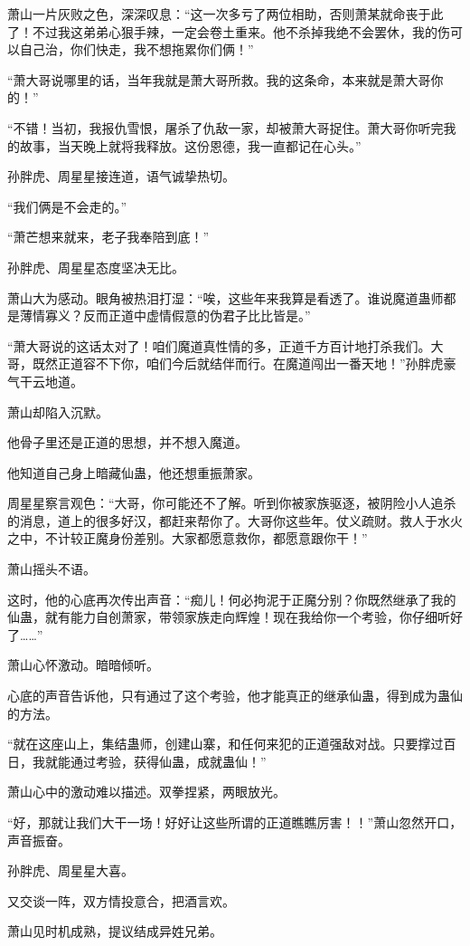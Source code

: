 \begin{this_body}
萧山一片灰败之色，深深叹息：“这一次多亏了两位相助，否则萧某就命丧于此了！不过我这弟弟心狠手辣，一定会卷土重来。他不杀掉我绝不会罢休，我的伤可以自己治，你们快走，我不想拖累你们俩！”

“萧大哥说哪里的话，当年我就是萧大哥所救。我的这条命，本来就是萧大哥你的！”

“不错！当初，我报仇雪恨，屠杀了仇敌一家，却被萧大哥捉住。萧大哥你听完我的故事，当天晚上就将我释放。这份恩德，我一直都记在心头。”

孙胖虎、周星星接连道，语气诚挚热切。

“我们俩是不会走的。”

“萧芒想来就来，老子我奉陪到底！”

孙胖虎、周星星态度坚决无比。

萧山大为感动。眼角被热泪打湿：“唉，这些年来我算是看透了。谁说魔道蛊师都是薄情寡义？反而正道中虚情假意的伪君子比比皆是。”

“萧大哥说的这话太对了！咱们魔道真性情的多，正道千方百计地打杀我们。大哥，既然正道容不下你，咱们今后就结伴而行。在魔道闯出一番天地！”孙胖虎豪气干云地道。

萧山却陷入沉默。

他骨子里还是正道的思想，并不想入魔道。

他知道自己身上暗藏仙蛊，他还想重振萧家。

周星星察言观色：“大哥，你可能还不了解。听到你被家族驱逐，被阴险小人追杀的消息，道上的很多好汉，都赶来帮你了。大哥你这些年。仗义疏财。救人于水火之中，不计较正魔身份差别。大家都愿意救你，都愿意跟你干！”

萧山摇头不语。

这时，他的心底再次传出声音：“痴儿！何必拘泥于正魔分别？你既然继承了我的仙蛊，就有能力自创萧家，带领家族走向辉煌！现在我给你一个考验，你仔细听好了……”

萧山心怀激动。暗暗倾听。

心底的声音告诉他，只有通过了这个考验，他才能真正的继承仙蛊，得到成为蛊仙的方法。

“就在这座山上，集结蛊师，创建山寨，和任何来犯的正道强敌对战。只要撑过百日，我就能通过考验，获得仙蛊，成就蛊仙！”

萧山心中的激动难以描述。双拳捏紧，两眼放光。

“好，那就让我们大干一场！好好让这些所谓的正道瞧瞧厉害！！”萧山忽然开口，声音振奋。

孙胖虎、周星星大喜。

又交谈一阵，双方情投意合，把酒言欢。

萧山见时机成熟，提议结成异姓兄弟。


\end{this_body}
